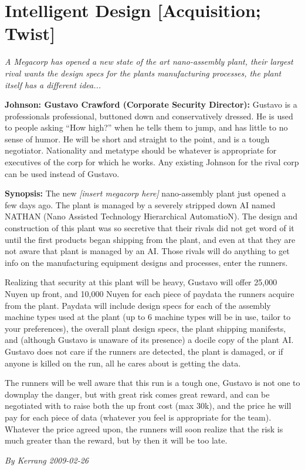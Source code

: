 \documentclass[letterpaper,twocolumn,10.5pt]{article}
\newenvironment{scenario}[6]
	{
		\section{#1 {\small[#2]}}
		\textit{#3}
		\def\TMPSCENARIO{#4 #5}
	}
	{\small\textit{By \TMPSCENARIO}}
\newcommand{\johnson}[2]{\textbf{Johnson: #1 (#2):}}
\newcommand{\synopsis}{\textbf{Synopsis: }}
\begin{document}
\begin{scenario}{Intelligent Design}
	{Acquisition; Twist}
	{ A Megacorp has opened a new state of the art nano-assembly plant, their largest rival wants the design specs for the plants manufacturing processes, the plant itself has a different idea...}
	{Kerrang}
	{2009-02-26}
	{https://forum.rpg.net/showthread.php?321504-Shadowrun-4th-101-Instant-Scenarios\&p=9944294#post9944294}

\johnson{Gustavo Crawford}{Corporate Security Director} Gustavo is a professionals professional, buttoned down and conservatively dressed. He is used to people asking ``How high?'' when he tells them to jump, and has little to no sense of humor. He will be short and straight to the point, and is a tough negotiator. Nationality and metatype should be whatever is appropriate for executives of the corp for which he works. Any existing Johnson for the rival corp can be used instead of Gustavo.

\synopsis The new \textit{[insert megacorp here]} nano-assembly plant just opened a few days ago. The plant is managed by a severely stripped down AI named \textsc{NATHAN} (Nano Assisted Technology Hierarchical AutomatioN). The design and construction of this plant was so secretive that their rivals did not get word of it until the first products began shipping from the plant, and even at that they are not aware that plant is managed by an AI. Those rivals will do anything to get info on the manufacturing equipment designs and processes, enter the runners.

Realizing that security at this plant will be heavy, Gustavo will offer 25,000 Nuyen up front, and 10,000 Nuyen for each piece of paydata the runners acquire from the plant. Paydata will include design specs for each of the assembly machine types used at the plant (up to 6 machine types will be in use, tailor to your preferences), the overall plant design specs, the plant shipping manifests, and (although Gustavo is unaware of its presence) a docile copy of the plant AI. Gustavo does not care if the runners are detected, the plant is damaged, or if anyone is killed on the run, all he cares about is getting the data.

The runners will be well aware that this run is a tough one, Gustavo is not one to downplay the danger, but with great risk comes great reward, and can be negotiated with to raise both the up front cost (max 30k), and the price he will pay for each piece of data (whatever you feel is appropriate for the team). Whatever the price agreed upon, the runners will soon realize that the risk is much greater than the reward, but by then it will be too late.


\end{scenario}
\end{document}
